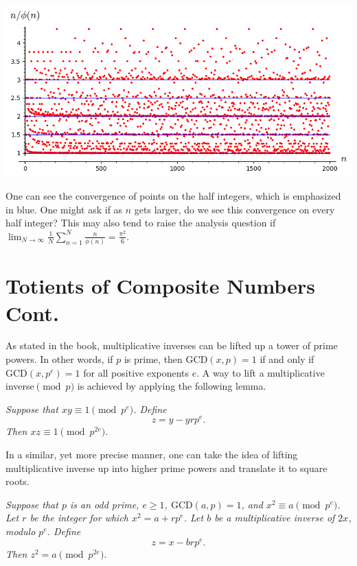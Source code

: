 \documentclass[12pt]{article}
\newenvironment{lemma}[2][Lemma]{\begin{trivlist}
\item[\hskip \labelsep {\bfseries #1}\hskip \labelsep {\bfseries #2}]}{\end{trivlist}}
\newenvironment{theorem}[2][Theorem]{\begin{trivlist}
\item[\hskip \labelsep {\bfseries #1}\hskip \labelsep {\bfseries #2}]}{\end{trivlist}}
\begin{document}
    \begin{center}
    \includegraphics[scale=.5]{plot445 (1).png}
    \end{center}
One can see the convergence of points on the half integers, which is emphasized in blue. One might ask if as $n$ gets larger, do we see this convergence on every half integer? This may also tend to raise the analysis question if $\lim_{N \to \infty} \frac{1}{N}\sum_{n = 1}^N \frac{n}{\phi(n)} = \frac{\pi^2}{6}$.

\section{Totients of Composite Numbers Cont.}

\hspace{1em} As stated in the book, multiplicative inverses can be lifted up a tower of prime powers. In other words, if $p$ is prime, then $\text{GCD}(x,p) = 1$ if and only if $\text{GCD}(x,p^e) = 1$ for all positive exponents $e$. A way to lift a multiplicative inverse$\pmod{p}$ is achieved by applying the following lemma. \cite[pg.183]{weissman_2017}

\begin{lemma}{7.16 (Lifting multiplicative inverses)} \textit{Suppose that $xy \equiv 1 \pmod{p^e}$. Define } $$z = y - yrp^e.$$ \textit{Then $xz \equiv 1 \pmod{p^{2e}}$}.
\end{lemma}

\vspace{1em}

In a similar, yet more precise manner, one can take the idea of lifting multiplicative inverse up into higher prime powers and translate it to square roots.

\begin{theorem}{7.20 (Lifting square roots)}
\textit{Suppose that $p$ is an odd prime, $e \geq 1$, $\text{GCD}(a,p) = 1$, and $x^2 \equiv a \pmod{p^e}$. Let $r$ be the integer for which $x^2 = a + rp^e$. Let $b$ be a multiplicative inverse of $2x$, modulo $p^e$. Define} $$z = x - brp^e.$$ \textit{Then $z^2 = a \pmod{p^{2e}}$}.
\end{theorem}
\end{document}
